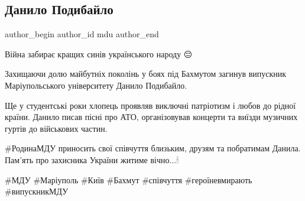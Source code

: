  
 
 
 
 

\subsection{Данило Подибайло}
\label{sec:01_06_2023.fb.mdu.1.danylo_podybajlo}

\ifcmt
 author_begin
   author_id mdu
 author_end
\fi

Війна забирає кращих синів українського народу 😔

Захищаючи долю майбутніх поколінь у боях під Бахмутом загинув випускник
Маріупольського університету Данило Подибайло.

Ще у студентські роки хлопець проявляв виключні патріотизм і любов до рідної
країни. Данило писав пісні про АТО, організовував концерти та виїзди музичних
гуртів до військових частин.


\#РодинаМДУ приносить свої співчуття близьким, друзям та побратимам Данила.
Пам'ять про захисника України житиме вічно...🕯

\#МДУ \#Маріуполь \#Київ \#Бахмут \#співчуття \#героїневмирають \#випускникМДУ

